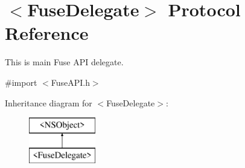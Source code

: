 \hypertarget{protocol_fuse_delegate-p}{}\section{$<$Fuse\+Delegate$>$ Protocol Reference}
\label{protocol_fuse_delegate-p}


This is main Fuse A\+P\+I delegate.  




{\ttfamily \#import $<$Fuse\+A\+P\+I.\+h$>$}

Inheritance diagram for $<$Fuse\+Delegate$>$\+:\begin{figure}[H]
\begin{center}
\leavevmode
\includegraphics[height=2.000000cm]{protocol_fuse_delegate-p}
\end{center}
\end{figure}
